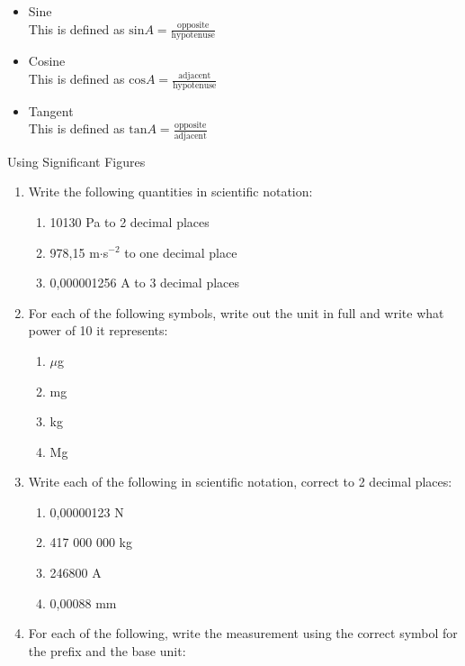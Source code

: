\begin{itemize}
 \item Sine\\
This is defined as $\text{sin} A = \frac{\text{opposite}}{\text{hypotenuse}}$
\item Cosine \\
This is defined as $\text{cos} A = \frac{\text{adjacent}}{\text{hypotenuse}}$
\item Tangent \\
This is defined as $\text{tan} A = \frac{\text{opposite}}{\text{adjacent}}$
\end{itemize}
\begin{exercises}{Using Significant Figures }
            \nopagebreak
\begin{enumerate}[noitemsep, label=\textbf{\arabic*}. ] 
\item Write the following quantities in scientific notation:
\begin{enumerate}[noitemsep, label=\textbf{\alph*}. ] 
\item 10130 Pa to 2 decimal places
\item 978,15 m$\ensuremath{\cdot}$s${}^{-2}$ to one decimal place
\item 0,000001256 A to 3 decimal places
\end{enumerate}
\item For each of the following symbols, write out the unit in full and write what power of 10 it represents:
  \begin{enumerate}[noitemsep, label=\textbf{\alph*}. ] 
  \item $\mu $g
  \item mg
  \item kg
  \item Mg
  \end{enumerate}
\item Write each of the following in scientific notation, correct to 2 decimal places:
  \begin{enumerate}[noitemsep, label=\textbf{\alph*}. ] 
  \item 0,00000123 N
  \item 417 000 000 kg
  \item 246800 A
  \item 0,00088 mm
  \end{enumerate}
\item For each of the following, write the measurement using the correct symbol for the prefix and the base unit:
  \begin{enumerate}[noitemsep, label=\textbf{\alph*}. ] 

\end{enumerate}
\end{enumerate}
\end{exercises}
